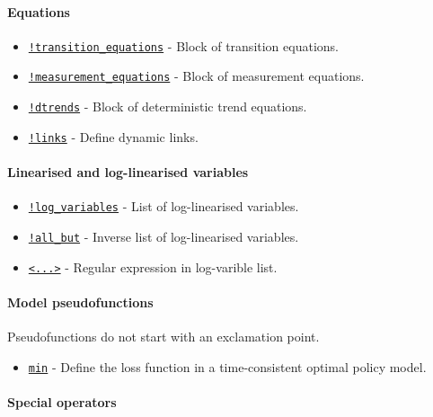  \paragraph{Equations}
 
 \begin{itemize}
 \item
   \href{modellang/transitionequations}{\texttt{!transition\_equations}}
   - Block of transition equations.
 \item
   \href{modellang/measurementequations}{\texttt{!measurement\_equations}}
   - Block of measurement equations.
 \item
   \href{modellang/dtrends}{\texttt{!dtrends}} - Block of deterministic
   trend equations.
 \item
   \href{modellang/links}{\texttt{!links}} - Define dynamic links.
 \end{itemize}
 
 \paragraph{Linearised and log-linearised variables}
 
 \begin{itemize}
 \item
   \href{modellang/logvariables}{\texttt{!log\_variables}} - List of
   log-linearised variables.
 \item
   \href{modellang/allbut}{\texttt{!all\_but}} - Inverse list of
   log-linearised variables.
 \item
   \href{modellang/regexpression}{\texttt{\textless{}...\textgreater{}}}
   - Regular expression in log-varible list.
 \end{itemize}
 
 \paragraph{Model pseudofunctions}
 
 Pseudofunctions do not start with an exclamation point.
 
 \begin{itemize}
 \item
   \href{modellang/min}{\texttt{min}} - Define the loss function in a
   time-consistent optimal policy model.
 \end{itemize}
 
 \paragraph{Special operators}
 

